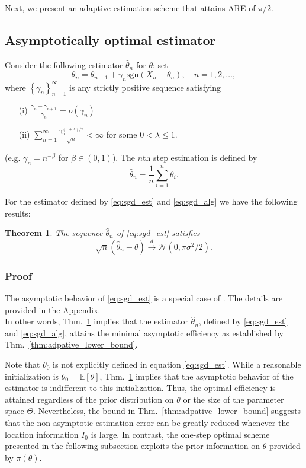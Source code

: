 \documentclass[letterpaper, conference]{IEEEtran}      %
\newtheorem{thm}{\bf{Theorem}}
\newcommand{\sgn}{\mathrm{sgn} }
\begin{document}
Next, we present an adaptive estimation scheme that attains ARE of $\pi/2$. 
\subsection{Asymptotically optimal estimator}
Consider the following estimator $\widehat{\theta}_n$ for $\theta$:  set 
\begin{equation}
\label{eq:sgd_alg}
\theta_n = \theta_{n-1} +  \gamma_n \sgn (X_n - \theta_n), \quad n = 1,2,\ldots,
\end{equation}
where $\left\{\gamma_n \right\}_{n=1}^\infty$ is any strictly positive sequence satisfying 
\begin{enumerate}
\item[(i)] $\frac{\gamma_n - \gamma_{n+1}}{\gamma_n} = o(\gamma_n)$ \\
\item[(ii)] $\sum_{n=1}^\infty \frac{\gamma_n^{(1+\lambda)/2}} {\sqrt{n}} < \infty$ 
for some $0< \lambda \leq 1$.
\end{enumerate}
(e.g. $\gamma_n = n^{-\beta}$ for $\beta \in (0,1)$). The $n$th step estimation is defined by 
\begin{equation} \label{eq:sgd_est}
\widehat{\theta}_n =  \frac{1}{n} \sum_{i=1}^n  \theta_i. 
\end{equation}

For the estimator defined by \eqref{eq:sgd_est} and \eqref{eq:sgd_alg} 
we have the following results:
\begin{thm} \label{thm:sgd}
The sequence $\widehat{\theta}_n$ of \eqref{eq:sgd_est} satisfies
\[
\sqrt{n} \left( \widehat{\theta}_n - \theta \right) \overset{d}{\rightarrow} \mathcal N \left(0,  \pi \sigma^2 /2 \right).
\]
\end{thm}

\subsubsection*{Proof}
The asymptotic behavior of \eqref{eq:sgd_est} is a special case of  \cite[Thm. 4]{polyak1992acceleration}. The details are provided in the Appendix.\\

In other words, Thm.~\ref{thm:sgd} implies that the estimator $\widehat{\theta}_n$, defined by \eqref{eq:sgd_est} and \eqref{eq:sgd_alg}, attains the minimal asymptotic efficiency as established by Thm.~\ref{thm:adpative_lower_bound}.\par
Note that $\theta_0$ is not explicitly defined 
in equation \eqref{eq:sgd_est}. While a reasonable initialization is $\theta_0 = \mathbb E [\theta]$,  Thm.~\ref{thm:sgd} implies that the asymptotic behavior of the estimator is indifferent to this initialization. Thus, the optimal efficiency is attained regardless of the prior distribution on $\theta$ or the size of the parameter space $\Theta$. Nevertheless, the bound in Thm.~\ref{thm:adpative_lower_bound} suggests that the non-asymptotic estimation error can be greatly reduced whenever the location information $I_0$ is large. In contrast, the one-step optimal scheme presented in the following subsection exploits the prior information on $\theta$ provided by $\pi(\theta)$.
\end{document}
